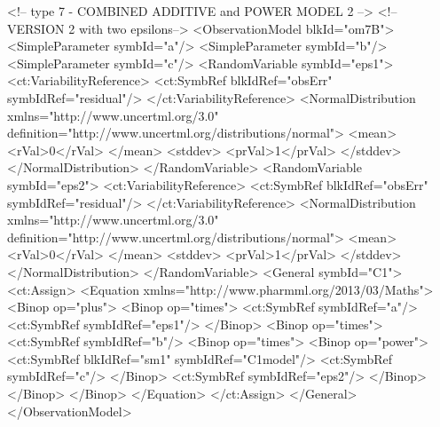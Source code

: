 \documentclass[a4paper,10pt]{article}
\begin{document}
\begin{xmlcode}
<!-- type 7 - COMBINED ADDITIVE and POWER MODEL 2 -->
<!-- VERSION 2 with two epsilons-->
<ObservationModel blkId="om7B">
    <SimpleParameter symbId="a"/>
    <SimpleParameter symbId="b"/>
    <SimpleParameter symbId="c"/>
    <RandomVariable symbId="eps1">
        <ct:VariabilityReference>
            <ct:SymbRef blkIdRef="obsErr" symbIdRef="residual"/>
        </ct:VariabilityReference>
        <NormalDistribution xmlns="http://www.uncertml.org/3.0" definition="http://www.uncertml.org/distributions/normal">
            <mean>
                <rVal>0</rVal>
            </mean>
            <stddev>
                <prVal>1</prVal>
            </stddev>
        </NormalDistribution>
    </RandomVariable>
    <RandomVariable symbId="eps2">
        <ct:VariabilityReference>
            <ct:SymbRef blkIdRef="obsErr" symbIdRef="residual"/>
        </ct:VariabilityReference>
        <NormalDistribution xmlns="http://www.uncertml.org/3.0" definition="http://www.uncertml.org/distributions/normal">
            <mean>
                <rVal>0</rVal>
            </mean>
            <stddev>
                <prVal>1</prVal>
            </stddev>
        </NormalDistribution>
    </RandomVariable>
    <General symbId="C1">
        <ct:Assign>
            <Equation xmlns="http://www.pharmml.org/2013/03/Maths">
                <Binop op="plus">
                    <Binop op="times">
                        <ct:SymbRef symbIdRef="a"/>
                        <ct:SymbRef symbIdRef="eps1"/>
                    </Binop>
                    <Binop op="times">
                        <ct:SymbRef symbIdRef="b"/>
                        <Binop op="times">
                            <Binop op="power">
                                <ct:SymbRef blkIdRef="sm1" symbIdRef="C1model"/>
                                <ct:SymbRef symbIdRef="c"/>
                            </Binop>
                            <ct:SymbRef symbIdRef="eps2"/>
                        </Binop>
                    </Binop>
                </Binop>
            </Equation>
        </ct:Assign>
    </General>
</ObservationModel> 
\end{xmlcode}





\end{document}
